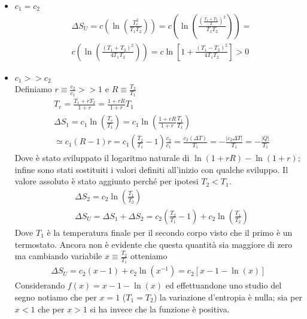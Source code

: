 \documentclass[10pt,a4paper]{article}
\begin{document}
\begin{itemize}
	\item \(c_1=c_2\)\\
	\begin{align*}
		&\Delta S_U = c\left(\ln\left(\frac{T_e^2}{T_1T_2}\right) \right) = c\left(\ln\left(\frac{(\frac{T_1 + T_2}{2})^2}{T_1T_2}\right) \right)=\\
		&c\left(\ln\left(\frac{(T_1 + T_2)^2}{4T_1T_2}\right) \right)=c \ln\left[1 + \frac{(T_1 - T_2)^2}{4T_1T_2}\right]>0
	\end{align*}
	\item \(c_1>>c_2\)\\
	Definiamo \(r \equiv \frac{c_2}{c_1}>>1\) e \(R \equiv \frac{T_2}{T_1}\)
	\begin{align*}
		&T_e = \frac{T_1 + r T_2}{1+r}= \frac{1+rR}{1+r}T_1\\
		&\Delta S_1 = c_1 \ln\left(\frac{T_e}{T_1}\right) = c_1 \ln\left(\frac{1+rR}{1+r}\frac{T_1}{T_1}\right)\\
		&\simeq c_1(R-1)r = c_1(\frac{T_2}{T_1}-1) \frac{c_2}{c_1} = \frac{c_2 (\Delta T)}{T_1} = -\frac{|c_2\Delta T|}{T_1}=-\frac{|Q|}{T_1}
	\end{align*}
	Dove è stato sviluppato il logaritmo naturale di \(\ln(1+rR)-\ln(1+r)\); infine sono stati sostituiti i valori definiti all'inizio con qualche sviluppo. Il valore assoluto è stato aggiunto perché per ipotesi \(T_2<T_1\).
	\begin{align*}
		&\Delta S_2 = c_2 \ln\left(\frac{T_1}{T_2}\right)\\
		&\Delta S_U = \Delta S_1 + \Delta S_2 = c_2 \left(\frac{T_2}{T_1}-1\right) +  c_2 \ln\left(\frac{T_1}{T_2}\right) 
	\end{align*}
	Dove \(T_1\) è la temperatura finale per il secondo corpo visto che il primo è un termostato. Ancora non è evidente che questa quantità sia maggiore di zero ma cambiando variabile \(x \equiv \frac{T_2}{T_1}\) otteniamo
	\begin{align*}
		\Delta S_U = c_2(x-1)+ c_2\ln(x^{-1}) = c_2\left[x-1-\ln(x)\right]
	\end{align*}
	Considerando \(f(x) = x-1-\ln(x)\) ed effettuandone uno studio del segno notiamo che per \(x=1\) (\(T_1= T_2\)) la variazione d'entropia è nulla; sia per \(x<1\) che per \(x>1\) si ha invece che la funzione è positiva. 
\end{itemize}
\end{document}
